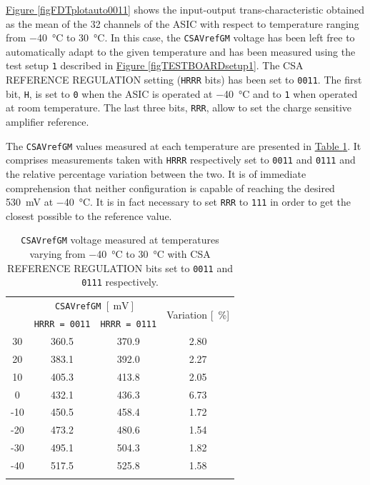 \par
\hyperref[figFDTplotauto0011]{Figure \ref{figFDTplotauto0011}} shows the input-output trans-characteristic obtained as the mean of the 32 channels of the ASIC with respect to temperature ranging from \SI{-40}{\celsius} to \SI{30}{\celsius}. In this case, the \texttt{CSAVrefGM} voltage has been left free to automatically adapt to the given temperature and has been measured using the test setup \texttt{1} described in \hyperref[figTESTBOARDsetup1]{Figure \ref{figTESTBOARDsetup1}}. The CSA REFERENCE REGULATION setting (\texttt{HRRR} bits) has been set to \texttt{0011}. The first bit, \texttt{H}, is set to \texttt{0} when the ASIC is operated at \SI{-40}{\celsius} and to \texttt{1} when operated at room temperature. The last three bits, \texttt{RRR}, allow to set the charge sensitive amplifier reference.

\noindent
The \texttt{CSAVrefGM} values measured at each temperature are presented in \hyperref[tablecsavref]{Table \ref{tablecsavref}}. It comprises measurements taken with \texttt{HRRR} respectively set to \texttt{0011} and \texttt{0111} and the relative percentage variation between the two. It is of immediate comprehension that neither configuration is capable of reaching the desired \SI{530}{\milli\volt} at \SI{-40}{\celsius}. It is in fact necessary to set \texttt{RRR} to \texttt{111} in order to get the closest possible to the reference value.

\begin{table}[ht]
    \centering
    \begin{tabular}{c c c c} 
        \Xhline{2\arrayrulewidth}
        \multirow{2}{*}{Temperature [\SI{}{\celsius}]} \T & \multicolumn{2}{p{5cm}}{\centering \texttt{CSAVrefGM} $[\SI{}{\milli\volt}]$} \T & \multirow{2}{*}{Variation [\SI{}{\percent}]} \\
        \cline{2-3}
        & \texttt{HRRR = 0011} & \texttt{HRRR = 0111} \B\\
        \hline
        30 & 360.5 & 370.9 & 2.80 \T\B \\
        20 & 383.1 & 392.0 & 2.27 \T\B \\
        10 & 405.3 & 413.8 & 2.05 \T\B \\
        0 & 432.1 & 436.3 & 6.73 \T\B \\
        -10 & 450.5 & 458.4 & 1.72 \T\B \\
        -20 & 473.2 & 480.6 & 1.54 \T\B \\
        -30 & 495.1 & 504.3 & 1.82 \T\B \\
        -40 & 517.5 & 525.8 & 1.58 \T\B \\
        \Xhline{2\arrayrulewidth}
    \end{tabular}
    \caption{\texttt{CSAVrefGM} voltage measured at temperatures varying from \SI{-40}{\celsius} to \SI{30}{\celsius} with CSA REFERENCE REGULATION bits set to \texttt{0011} and \texttt{0111} respectively.}
    \label{tablecsavref}
\end{table}


